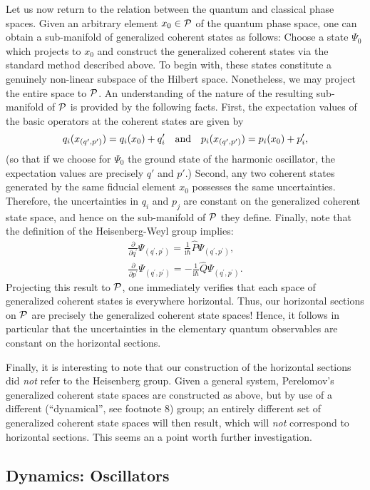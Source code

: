 \documentclass[12pt,aps,eqsecnum,tighten]{revtex4-2}
\def\be{\begin{equation}}
\def\ee{\end{equation}}
\def\ba{\begin{eqnarray}}
\def\ea{\end{eqnarray}}
\def\i{\mathrm{i}}
\def\P{{\cal P}}
\begin{document}
Let us now return to the relation between the quantum and classical
phase spaces. Given an arbitrary element $x_0 \in \P$ of the quantum
phase space, one can obtain a sub-manifold of generalized coherent
states as follows: Choose a state $\Psi_0$ which projects to $x_0$ and
construct the generalized coherent states via the standard method
described above. To begin with, these states constitute a genuinely
non-linear subspace of the Hilbert space. Nonetheless, we may project
the entire space to $\P$. An understanding of the nature of the
resulting sub-manifold of $\P$ is provided by the following
facts. First, the expectation values of the basic operators at the
coherent states are given by
%
\be
  q_i( x_{(q^\prime, p^\prime)} ) = q_i( x_0 ) + q^\prime_i
	\quad {\rm and} \quad
  p_i( x_{(q^\prime, p^\prime)} ) = p_i( x_0 ) + p^\prime_i,
\ee
%
(so that if we choose for $\Psi_0$ the ground state of the harmonic
oscillator, the expectation values are precisely $q'$ and $p'$.)
Second, any two coherent states generated by the same fiducial element
$x_0$ possesses the same uncertainties. Therefore, the uncertainties
in $q_i$ and $p_j$ are constant on the generalized coherent state
space, and hence on the sub-manifold of $\P$ they define. Finally, 
note that the definition of the Heisenberg-Weyl group
implies:
%
\ba \frac{\partial}{\partial q^\prime}
\Psi_{(q^\prime, p^\prime)} = \frac{1}{\i\hbar} \hat{P}
\Psi_{(q^\prime, p^\prime)}, \\ \frac{\partial}{\partial p^\prime}
\Psi_{(q^\prime, p^\prime)} = - \frac{1}{\i\hbar} \hat{Q}
\Psi_{(q^\prime, p^\prime)}.  
\ea 
%
Projecting this result to $\P$, one immediately verifies that each
space of generalized coherent states is everywhere horizontal. Thus,
our horizontal sections on $\P$ are precisely the generalized coherent
state spaces! Hence, it follows in particular that the uncertainties
in the elementary quantum observables are constant on the horizontal
sections.

Finally, it is interesting to note that our construction of the
horizontal sections did {\em not} refer to the Heisenberg group.
Given a general system, Perelomov's generalized coherent state spaces
are constructed as above, but by use of a different (``dynamical'',
see footnote 8) group; an entirely different set of
generalized coherent state spaces will then result, which will {\em
not} correspond to horizontal sections.  This seems an a point worth
further investigation.


\subsection{Dynamics: Oscillators} \label{sec4.B}
\end{document}
